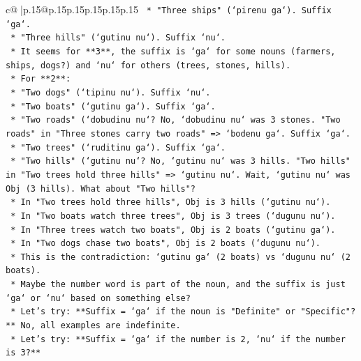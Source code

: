 \documentclass{article}
\begin{document}
{\begin{supertabular}{c@{$\;$}|p{.15\linewidth}@{}p{.15\linewidth}p{.15\linewidth}p{.15\linewidth}p{.15\linewidth}p{.15\linewidth}}
{{{\texttt{                    *   "Three ships" (`pirenu ga`). Suffix `ga`.} \\
\texttt{                    *   "Three hills" (`gutinu nu`). Suffix `nu`.} \\
\texttt{                    *   It seems for **3**, the suffix is `ga` for some nouns (farmers, ships, dogs?) and `nu` for others (trees, stones, hills).} \\
\texttt{                    *   For **2**:} \\
\texttt{                        *   "Two dogs" (`tipinu nu`). Suffix `nu`.} \\
\texttt{                        *   "Two boats" (`gutinu ga`). Suffix `ga`.} \\
\texttt{                        *   "Two roads" (`dobudinu nu`? No, `dobudinu nu` was 3 stones. "Two roads" in "Three stones carry two roads" => `bodenu ga`. Suffix `ga`.} \\
\texttt{                        *   "Two trees" (`ruditinu ga`). Suffix `ga`.} \\
\texttt{                        *   "Two hills" (`gutinu nu`? No, `gutinu nu` was 3 hills. "Two hills" in "Two trees hold three hills" => `gutinu nu`. Wait, `gutinu nu` was Obj (3 hills). What about "Two hills"?} \\
\texttt{                        *   In "Two trees hold three hills", Obj is 3 hills (`gutinu nu`).} \\
\texttt{                        *   In "Two boats watch three trees", Obj is 3 trees (`dugunu nu`).} \\
\texttt{                        *   In "Three trees watch two boats", Obj is 2 boats (`gutinu ga`).} \\
\texttt{                        *   In "Two dogs chase two boats", Obj is 2 boats (`dugunu nu`).} \\
\texttt{                        *   This is the contradiction: `gutinu ga` (2 boats) vs `dugunu nu` (2 boats).} \\
\texttt{                        *   Maybe the number word is part of the noun, and the suffix is just `ga` or `nu` based on something else?} \\
\texttt{                        *   Let's try: **Suffix = `ga` if the noun is "Definite" or "Specific"?** No, all examples are indefinite.} \\
\texttt{                        *   Let's try: **Suffix = `ga` if the number is 2, `nu` if the number is 3?**} \\
}}}
\end{supertabular}}
\end{document}
